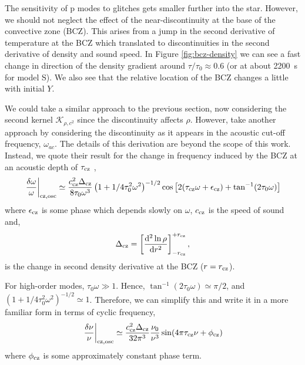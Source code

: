 The sensitivity of p modes to glitches gets smaller further into the star. However, we should not neglect the effect of the near-discontinuity at the base of the convective zone (BCZ). This arises from a jump in the second derivative of temperature at the BCZ which translated to discontinuities in the second derivative of density and sound speed. In Figure \ref{fig:bcz-density} we can see a fast change in direction of the density gradient around \(\tau/\tau_0 \approx 0.6\) (or at about \SI{2200}{\second} for model S). We also see that the relative location of the BCZ changes a little with initial \(Y\).


We could take a similar approach to the previous section, now considering the second kernel \(\mathcal{K}_{\rho,c^2}\) since the discontinuity affects \(\rho\). However, \citet{Houdek.Gough2007} take another approach by considering the discontinuity as it appears in the acoustic cut-off frequency, \(\omega_{ac}\). The details of this derivation are beyond the scope of this work. Instead, we quote their result for the change in frequency induced by the BCZ at an acoustic depth of \(\tau_{{\mathrm{cz}}}\) \citep[cf.][Eq. 17]{Houdek.Gough2007},
%
\begin{equation}
    \left.\frac{\delta\omega}{\omega}\right|_{{\mathrm{cz}},\mathrm{osc}} \simeq \frac{c_{{\mathrm{cz}}}^2\Delta_{{\mathrm{cz}}}}{8\tau_0 \omega^3} \left(1 + {1}/{4\tau_0^2\omega^2}\right)^{-1/2} \cos\left[2(\tau_{{\mathrm{cz}}} \omega + \epsilon_{{\mathrm{cz}}}) + \tan^{-1}(2\tau_0\omega)\right]
\end{equation}
%
where \(\epsilon_{{\mathrm{cz}}}\) is some phase which depends slowly on \(\omega\), \(c_{{\mathrm{cz}}}\) is the speed of sound and,
%
\begin{equation}
    \Delta_{{\mathrm{cz}}} = \left[\frac{\mathrm{d}^2 \ln\rho}{\mathrm{d} r^2}\right]_{-r_{{\mathrm{cz}}}}^{+r_{{\mathrm{cz}}}},
\end{equation}
%
is the change in second density derivative at the BCZ (\(r = r_{{\mathrm{cz}}}\)).

For high-order modes, \(\tau_0 \omega \gg 1\). Hence, \(\tan^{-1}(2\tau_0\omega) \simeq \pi/2\), and \((1 + {1}/{4\tau_0^2\omega^2})^{-1/2} \simeq 1\). Therefore, we can simplify this and write it in a more familiar form in terms of cyclic frequency,
%
\begin{equation}
    \left.\frac{\delta\nu}{\nu}\right|_{{\mathrm{cz}},\mathrm{osc}} \simeq \frac{c_{{\mathrm{cz}}}^2\Delta_{{\mathrm{cz}}}}{32\pi^3}\frac{\nu_0}{\nu^3} \sin(4\pi\tau_{{\mathrm{cz}}}\nu + \phi_{{\mathrm{cz}}}) \label{eq:bcz-osc}
\end{equation}
%
where \(\phi_{{\mathrm{cz}}}\) is some approximately constant phase term.


